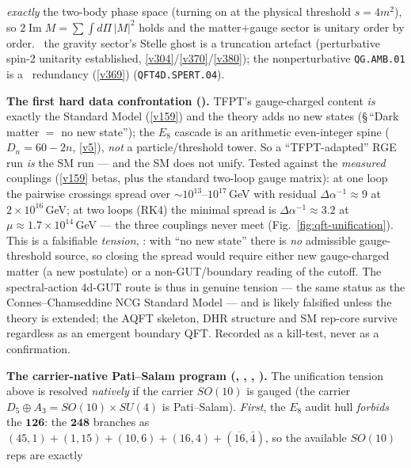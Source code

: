 \emph{exactly} the two-body phase space (turning on at the physical threshold $s{=}4m^2$), so
$2\operatorname{Im}M=\sum\!\int d\Pi\,|M|^2$ holds and the matter$+$gauge sector is unitary order by order.
\mC\ the gravity sector's Stelle ghost is a truncation artefact (perturbative spin-2 unitarity established,
\vref{v304}/\vref{v370}/\vref{v380}); the nonperturbative \texttt{QG.AMB.01} is a \mC\ redundancy (\vref{v369})
(\texttt{QFT4D.SPERT.04}).
\par\smallskip\noindent\textbf{The first hard data confrontation
().} TFPT's gauge-charged content \emph{is} exactly the
Standard Model (\vref{v159}) and the theory adds no new states (\S\,``Dark matter $=$ no new state''); the
$E_8$ cascade is an arithmetic even-integer spine ($D_n{=}60{-}2n$, \vref{v5}), \emph{not} a
particle/threshold tower. So a ``TFPT-adapted'' RGE run \emph{is} the SM run --- and the SM does not unify.
Tested against the \emph{measured} couplings (\vref{v159} betas, plus the standard two-loop gauge matrix):
at one loop the pairwise crossings spread over ${\sim}10^{13}$--$10^{17}$\,GeV with residual
$\Delta\alpha^{-1}\approx9$ at $2{\times}10^{16}$\,GeV; at two loops (RK4) the minimal spread is
$\Delta\alpha^{-1}\approx3.2$ at $\mu\approx1.7{\times}10^{14}$\,GeV --- the three couplings never meet
(Fig.~\ref{fig:qft-unification}). This is a falsifiable \emph{tension}, \mX: with ``no new state'' there is
\emph{no} admissible gauge-threshold source, so closing the spread would require either new gauge-charged
matter (a new postulate) or a non-GUT/boundary reading of the cutoff. The spectral-action 4d-GUT route is
thus in genuine tension --- the same status as the Connes--Chamseddine NCG Standard Model --- and is likely
falsified unless the theory is extended; the AQFT skeleton, DHR structure and SM rep-core survive regardless
as an emergent boundary QFT. Recorded as a kill-test, never as a confirmation.
\par\smallskip\noindent\textbf{The carrier-native Pati--Salam program
(, , ,
).} The unification tension above is resolved \emph{natively} if the
carrier $SO(10)$ is gauged (the carrier $D_5{\oplus}A_3 = SO(10){\times}SU(4)$ is Pati--Salam). \emph{First},
the $E_8$ audit hull \emph{forbids} the $\mathbf{126}$: the $\mathbf{248}$ branches as
$(45,1){+}(1,15){+}(10,6){+}(16,4){+}(\overline{16},\bar4)$, so the available $SO(10)$ reps are exactly
